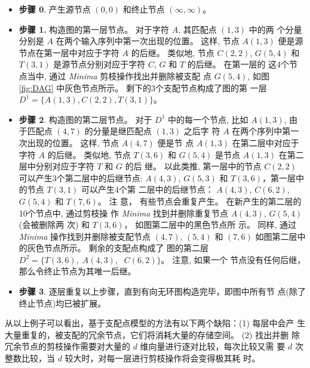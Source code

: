 \begin{itemize}
\item \textbf{步骤 0}. 产生源节点 $(0,0)$ 和终止节点 $(\infty, \infty)$。
\item \textbf{步骤 1.} 构造图的第一层节点。 对于字符 $A$, 其匹配点 $(1,3)$ 中的两
  个分量分别是 $A$ 在两个输入序列中第一次出现的位置。 这样, 节点 $A(1,3)$ 便是源
  节点在第一层中对应于字符 $A$ 的后继。 类似地, 节点 $C(2,2)$,
  $G(5,4)$ 和 $T(3,1)$ 是源节点分别对应于字符 $C$, $G$ 和 $T$ 的后继。 在第一层的
  这4个节点当中, 通过 \emph{Minima} 剪枝操作找出并删除被支配
  点 $G(5,4)$, 如图 \ref{fig:DAG} 中灰色节点所示。 剩下的3个支配节点构成了图的第
  一层 $D^1=\{A(1,3),C(2,2),T(3,1)\}$。
  
\item \textbf{步骤 2}. 构造图的第二层节点。 对于 $D^1$ 中的每一个节点,
  比如 $A(1,3)$, 由于匹配点 $(4,7)$ 的分量是继匹配点 $(1,3)$ 之后字
  符 $A$ 在两个序列中第一次出现的位置。 这样, 节点 $A(4,7)$ 便是节
  点 $A(1, 3)$ 在第二层中对应于字符 $A$ 的后继。 类似地, 节点 $T(3,6)$
  和 $G(5,4)$ 是节点 $A(1, 3)$ 在第二层中分别对应于字符 $T$ 和 $G$ 的后
  继。 以此类推, 第一层中的节点 $C(2,2)$ 可以产生3个第二层中的后继节点:
  $A(4,3)$, $G(5,3)$ 和 $T(3,6)$，第一层中的节点 $T(3,1)$ 可以产生4个第
  二层中的后继节点： $A(4,3)$, $C(6,2)$, $G(5,4)$ 和 $T(7,6)$。 注
  意， 有些节点会重复产生。 在新产生的第二层的10个节点中, 通过剪枝操
  作 \emph{Minima} 找到并删除重复节点 $A(4,3)$, $G(5,4)$ (会被删除两
  次) 和 $T(3,6)$， 如图第二层中的黑色节点所
  示。 同样, 通过 \emph{Minima} 操作找到并删除被支配节点 $(4, 7)$,
  $(5, 4)$ 和 $(7, 6)$ 如图第二层中的灰色节点所示。 剩余的支配点构成了
  图的第二层 $D^2=\{T(3, 6),\; A(4, 3),\;$ $C(6,2)\}$。 注意, 如果一个
  节点没有任何后继，那么令终止节点为其唯一后继。
\item \textbf{步骤 3}. 逐层重复以上步骤，直到有向无环图构造完毕，即图中所有节
  点(除了终止节点)均已被扩展。
  
\end{itemize}

从以上例子可以看出，基于支配点模型的方法有以下两个缺陷：(1) 每层中会产
生大量重复的，被支配的冗余节点，它们将消耗大量的存储空间。 (2) 找出并删
除冗余节点的剪枝操作需要对大量的 $d$ 维向量进行逐对比较，每次比较又需
要 $d$ 次整数比较，当 $d$ 较大时，对每一层进行剪枝操作将会变得极其耗
时。

